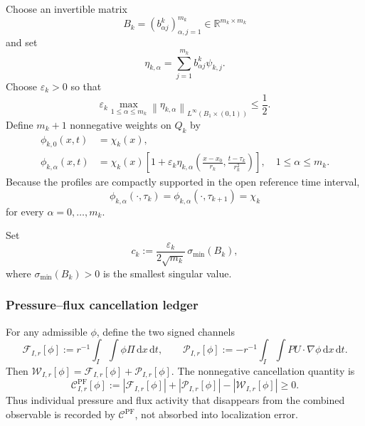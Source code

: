 \documentclass[10pt,a4paper]{amsart}
\numberwithin{equation}{section}
\newcommand{\R}{\mathbb R}
\newcommand{\eps}{\varepsilon}
\newcommand{\dxdt}{\,\mathrm dx\,\mathrm dt}
\newcommand{\norm}[2]{\left\lVert #1\right\rVert_{#2}}
\newcommand{\abs}[1]{\left\lvert #1\right\rvert}
\newcommand{\W}{\mathcal W}
\newcommand{\Cpf}{\mathcal C^{\mathrm{PF}}}
\begin{document}
Choose an invertible matrix
\begin{equation}\label{eq:Bmatrix}
B_k=(b^k_{\alpha j})_{\alpha,j=1}^{m_k}
\in\R^{m_k\times m_k}
\end{equation}
and set
\begin{equation}\label{eq:eta-alpha}
\eta_{k,\alpha}
=
\sum_{j=1}^{m_k}b^k_{\alpha j}\psi_{k,j}.
\end{equation}
Choose \(\eps_k>0\) so that
\begin{equation}\label{eq:eps-positive}
\eps_k\max_{1\le\alpha\le m_k}
\norm{\eta_{k,\alpha}}{L^\infty(B_1\times(0,1))}
\le\frac12.
\end{equation}
Define \(m_k+1\) nonnegative weights on \(Q_k\) by
\begin{align}
\phi_{k,0}(x,t)&=\chi_k(x),
\label{eq:phi0}
\\
\phi_{k,\alpha}(x,t)
&=
\chi_k(x)
\left[
1+\eps_k\eta_{k,\alpha}\left(
\frac{x-x_0}{r_k},
\frac{t-\tau_k}{r_k^2}
\right)
\right],
\quad 1\le\alpha\le m_k.
\label{eq:phialpha}
\end{align}
Because the profiles are compactly supported in the open reference time interval,
\begin{equation}\label{eq:common-endpoints}
\phi_{k,\alpha}(\cdot,\tau_k)
=
\phi_{k,\alpha}(\cdot,\tau_{k+1})
=
\chi_k
\end{equation}
for every \(\alpha=0,\ldots,m_k\).

Set
\begin{equation}\label{eq:ck}
c_k
:=
\frac{\eps_k}{2\sqrt{m_k}}\,
\sigma_{\min}(B_k),
\end{equation}
where \(\sigma_{\min}(B_k)>0\) is the smallest singular value.

\subsubsection{Pressure--flux cancellation ledger}

For any admissible \(\phi\), define the two signed channels
\begin{equation}\label{eq:channels}
\mathcal F_{I,r}[\phi]
:=
r^{-1}\int_I\int\phi\Pi\dxdt,
\qquad
\mathcal P_{I,r}[\phi]
:=
-r^{-1}\int_I\int PU\cdot\nabla\phi\dxdt.
\end{equation}
Then \(\W_{I,r}[\phi]=\mathcal F_{I,r}[\phi]+\mathcal P_{I,r}[\phi]\). The nonnegative cancellation quantity is
\begin{equation}\label{eq:cancellation}
\Cpf_{I,r}[\phi]
:=
\abs{\mathcal F_{I,r}[\phi]}
+
\abs{\mathcal P_{I,r}[\phi]}
-
\abs{\W_{I,r}[\phi]}
\ge0.
\end{equation}
Thus individual pressure and flux activity that disappears from the combined observable is recorded by \(\Cpf\), not absorbed into localization error.
\end{document}
